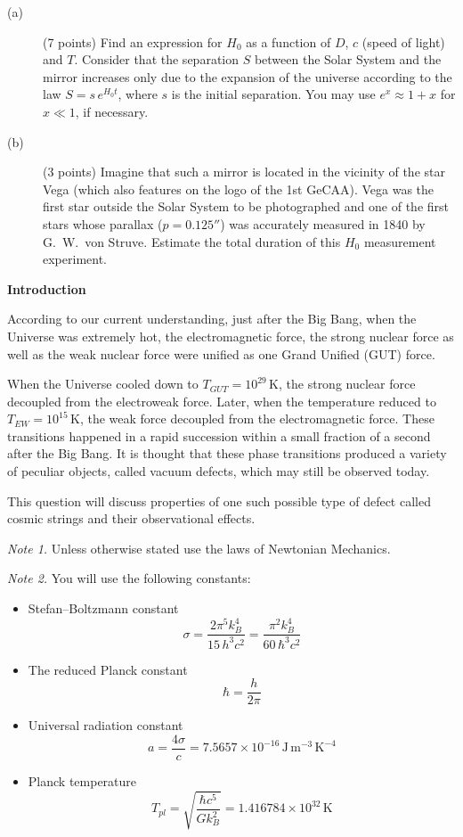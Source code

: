 \begin{description}
\item[(a)] (7 points) Find an expression for $H_0$ as a function of $D$, $c$
  (speed of light) and $T$. Consider that the separation $S$ between the Solar
  System and the mirror increases only due to the expansion of the universe
  according to the law $S = s\,e^{H_0 t}$, where $s$ is the initial
  separation. You may use $e^x \approx 1 + x$ for $x \ll 1$, if necessary.
\item[(b)] (3 points) Imagine that such a mirror is located in the vicinity of
  the star Vega (which also features on the logo of the 1st GeCAA). Vega was
  the first star outside the Solar System to be photographed and one of the
  first stars whose parallax ($p = 0.125''$) was accurately measured in 1840
  by G.~W.~von Struve. Estimate the total duration of this $H_0$ measurement
  experiment.
\end{description}

\textbf{Introduction}

According to our current understanding, just after the Big Bang, when the
Universe was extremely hot, the electromagnetic force, the strong nuclear
force as well as the weak nuclear force were unified as one Grand Unified
(GUT) force.

When the Universe cooled down to $T_{GUT} = 10^{29}$\,K, the strong nuclear
force decoupled from the electroweak force. Later, when the temperature
reduced to $T_{EW} = 10^{15}$\,K, the weak force decoupled from the
electromagnetic force. These transitions happened in a rapid succession within
a small fraction of a second after the Big Bang. It is thought that these
phase transitions produced a variety of peculiar objects, called vacuum
defects, which may still be observed today.

This question will discuss properties of one such possible type of defect
called cosmic strings and their observational effects.

\emph{Note 1.} Unless otherwise stated use the laws of Newtonian Mechanics.

\emph{Note 2.} You will use the following constants:
\begin{itemize}
\item Stefan--Boltzmann constant
  \[ \sigma = \frac{2\pi^5 k_B^4}{15\,h^3 c^2}
            = \frac{\pi^2 k_B^4}{60\,\hbar^3 c^2} \]
\item The reduced Planck constant
  \[ \hbar = \frac{h}{2\pi} \]
\item Universal radiation constant
  \[ a = \frac{4\sigma}{c}
       = 7.5657 \times 10^{-16}\,\mathrm{J\,m^{-3}\,K^{-4}} \]
\item Planck temperature
  \[ T_{pl} = \sqrt{\frac{\hbar c^5}{G k_B^2}}
            = 1.416784 \times 10^{32}\,\mathrm{K} \]
\end{itemize}

